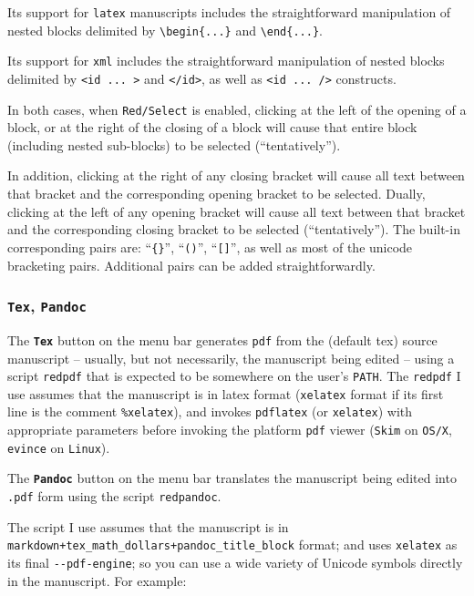 \documentclass[
]{article}
\begin{document}
Its support for \texttt{latex} manuscripts includes the straightforward
manipulation of nested blocks delimited by
\texttt{\textbackslash{}begin\{...\}} and
\texttt{\textbackslash{}end\{...\}}.

Its support for \texttt{xml} includes the straightforward manipulation
of nested blocks delimited by
\texttt{\textless{}id\ ...\ \textgreater{}} and
\texttt{\textless{}/id\textgreater{}}, as well as
\texttt{\textless{}id\ ...\ /\textgreater{}} constructs.

In both cases, when \texttt{Red/Select} is enabled, clicking at the left
of the opening of a block, or at the right of the closing of a block
will cause that entire block (including nested sub-blocks) to be
selected (``tentatively'').

In addition, clicking at the right of any closing bracket will cause all
text between that bracket and the corresponding opening bracket to be
selected. Dually, clicking at the left of any opening bracket will cause
all text between that bracket and the corresponding closing bracket to
be selected (``tentatively''). The built-in corresponding pairs are:
``\texttt{\{\}}'', ``\texttt{()}'', ``\texttt{{[}{]}}'', as well as most
of the unicode bracketing pairs. Additional pairs can be added
straightforwardly.

\hypertarget{tex-pandoc}{%
\subsubsection{\texorpdfstring{\texttt{Tex},
\texttt{Pandoc}}{Tex, Pandoc}}\label{tex-pandoc}}

The \textbf{\texttt{Tex}} button on the menu bar generates \texttt{pdf}
from the (default tex) source manuscript -- usually, but not
necessarily, the manuscript being edited -- using a script
\texttt{redpdf} that is expected to be somewhere on the user's
\texttt{PATH}. The \texttt{redpdf} I use assumes that the manuscript is
in latex format (\texttt{xelatex} format if its first line is the
comment \texttt{\%xelatex}), and invokes \texttt{pdflatex} (or
\texttt{xelatex}) with appropriate parameters before invoking the
platform \texttt{pdf} viewer (\texttt{Skim} on \texttt{OS/X},
\texttt{evince} on \texttt{Linux}).

The \textbf{\texttt{Pandoc}} button on the menu bar translates the
manuscript being edited into \texttt{.pdf} form using the script
\texttt{redpandoc}.

The script I use assumes that the manuscript is in
\texttt{markdown+tex\_math\_dollars+pandoc\_title\_block} format; and
uses \texttt{xelatex} as its final \texttt{-\/-pdf-engine}; so you can
use a wide variety of Unicode symbols directly in the manuscript. For
example:
\end{document}
